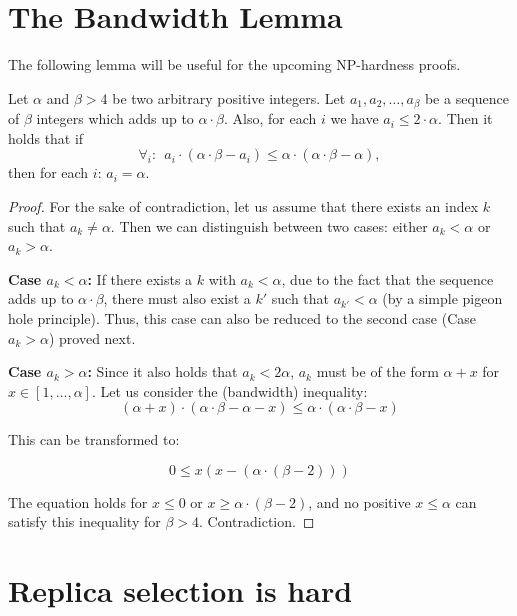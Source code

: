 \documentclass[9pt]{sigcomm-alternate}
\newcommand{\clauses}{\alpha}
\newcommand{\variables}{\beta}
\begin{document}
\begin{appendix}

\section{The Bandwidth Lemma}

The following lemma will be useful for the upcoming NP-hardness proofs.

\begin{lemma}\label{lem:bandwidth-lemma}
  Let $\clauses$ and $\variables > 4$ be two arbitrary positive integers. Let $a_1, a_2, \ldots,
  a_{\variables}$ be a sequence of $\variables$ integers which adds up to $\clauses \cdot \variables$. Also, for
  each $i$ we have $a_i \leq 2 \cdot \clauses$. Then it holds that if
  $$ \forall_i:~~ a_i \cdot (\clauses \cdot \variables - a_i) \leq \clauses \cdot (\clauses \cdot \variables -
  \clauses), $$
\noindent  then for each $i$: $a_i = \clauses$.
\end{lemma}
\begin{proof}
For the sake of contradiction, let us assume that there exists an index $k$ such that
$a_k \neq \clauses$. Then we can distinguish between two cases:
either $a_k<\clauses$ or
$a_k>\clauses$.

\textbf{Case $a_k<\clauses$:} If there exists a $k$ with $a_k<\clauses$,
due to the fact that the sequence adds up to $\clauses \cdot \variables$,
there must also exist a $k'$ such that $a_{k'}<\clauses$ (by a simple
pigeon hole principle). Thus, this case can
also be reduced to the second case (Case $a_k>\clauses$) proved
next.

\textbf{Case $a_k>\clauses$:} Since it also holds that $a_k < 2\clauses$,
$a_k$ must be of the form $\clauses + x$ for $x \in [1, \ldots, \clauses]$.
Let us consider the (bandwidth) inequality:
$$ (\clauses + x) \cdot (\clauses \cdot \variables - \clauses - x) \leq \clauses \cdot (\clauses \cdot \variables - x) $$

This can be transformed to:

$$ 0 \leq x(x - (\clauses \cdot (\variables - 2))) $$

The equation holds for $x \leq 0$ or $x \geq \clauses \cdot (\variables - 2)$,
and no
positive $x \leq \clauses$ can satisfy this inequality for $\variables > 4$. Contradiction.
\end{proof}


\section{Replica selection is hard}\label{ap:tworep}


\end{appendix}
\end{document}
